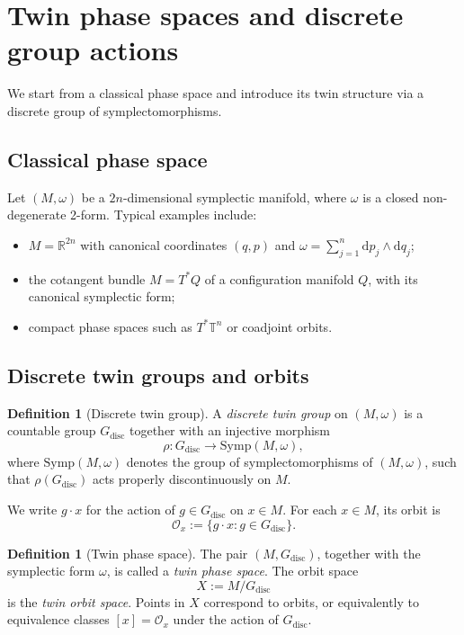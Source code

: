 \documentclass[11pt]{article}
\numberwithin{equation}{section}
\theoremstyle{definition}
\newtheorem{definition}[theorem]{Definition}
\theoremstyle{remark}
\newcommand{\R}{\mathbb{R}}
\newcommand{\dd}{\mathrm{d}}
\newcommand{\T}{\mathbb{T}}
\newcommand{\Gdisc}{G_{\mathrm{disc}}}
\begin{document}
	
	\section{Twin phase spaces and discrete group actions}
	\label{sec:twin-phase}
	
	We start from a classical phase space and introduce its twin
	structure via a discrete group of symplectomorphisms.
	
	\subsection{Classical phase space}
	
	Let $(M,\omega)$ be a $2n$-dimensional symplectic manifold, where
	$\omega$ is a closed non-degenerate 2-form. Typical examples include:
	\begin{itemize}[leftmargin=2em]
		\item $M=\R^{2n}$ with canonical coordinates $(q,p)$ and
		$\omega = \sum_{j=1}^n \dd p_j \wedge \dd q_j$;
		\item the cotangent bundle $M = T^*Q$ of a configuration manifold $Q$,
		with its canonical symplectic form;
		\item compact phase spaces such as $T^*\T^n$ or coadjoint orbits.
	\end{itemize}
	
	\subsection{Discrete twin groups and orbits}
	
	\begin{definition}[Discrete twin group]
		A \emph{discrete twin group} on $(M,\omega)$ is a countable group
		$\Gdisc$ together with an injective morphism
		\[
		\rho : \Gdisc \to \mathrm{Symp}(M,\omega),
		\]
		where $\mathrm{Symp}(M,\omega)$ denotes the group of symplectomorphisms
		of $(M,\omega)$, such that $\rho(\Gdisc)$ acts properly discontinuously
		on $M$.
	\end{definition}
	
	We write $g\cdot x$ for the action of $g\in\Gdisc$ on $x\in M$. For each
	$x\in M$, its orbit is
	\[
	\mathcal{O}_x := \{g\cdot x : g\in\Gdisc\}.
	\]
	
	\begin{definition}[Twin phase space]
		The pair $(M,\Gdisc)$, together with the symplectic form $\omega$, is
		called a \emph{twin phase space}. The orbit space
		\[
		X := M/\Gdisc
		\]
		is the \emph{twin orbit space}. Points in $X$ correspond to orbits, or
		equivalently to equivalence classes $[x]=\mathcal{O}_x$ under the
		action of $\Gdisc$.
	\end{definition}
	
\end{document}
